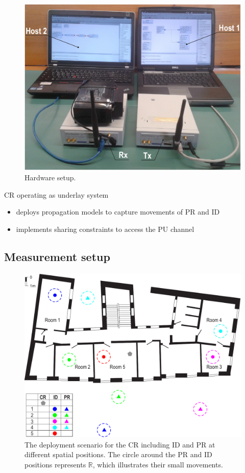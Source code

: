 \begin{figure}[!t]
        \centering
        \includegraphics[width = 0.8\columnwidth]{../kapitel05/figures/setup}
        \caption{Hardware setup.}
        \label{fig:hw_setup}
\end{figure}


\ac{CR} operating as underlay system \cite{Kaushik_CROWNCOM}
\begin{itemize}
\item deploys propagation models to capture movements of \ac{PR} and \ac{ID}
\item implements sharing constraints to access the \ac{PU} channel 
\end{itemize}

\subsection{Measurement setup}
\begin{figure}[!t]
        \centering
        \includegraphics[width = \columnwidth]{../kapitel05/figures/floor_B}
        \caption{The deployment scenario for the CR including ID and PR at different spatial positions. The circle around the PR and ID positions represents $\mathbb{R}$, which illustrates their small movements.}
        \label{fig:deploymentScenario}
\end{figure}

